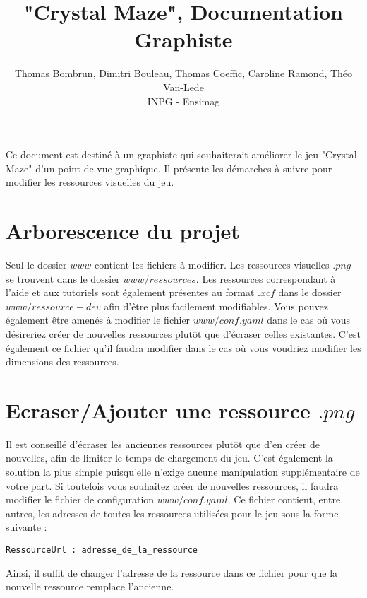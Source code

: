 \documentclass[11pt]{article}
\begin{document}
\title{"Crystal Maze", Documentation Graphiste}
\author{Thomas Bombrun, Dimitri Bouleau, Thomas Coeffic, Caroline Ramond, Théo Van-Lede\\
INPG - Ensimag}
\renewcommand{\today}{17 Juin 2014}
\maketitle

Ce document est destiné à un graphiste qui souhaiterait améliorer le jeu "Crystal Maze" d'un point de vue graphique. Il présente les démarches à suivre pour modifier les ressources visuelles du jeu.

\section{Arborescence du projet}
Seul le dossier $www$ contient les fichiers à modifier. Les ressources visuelles $.png$ se trouvent dans le dossier $www/ressources$. Les ressources correspondant à l'aide et aux tutoriels sont également présentes au format $.xcf$ dans le dossier $www/ressource-dev$ afin d'être plus facilement modifiables. Vous pouvez également être amenés à modifier le fichier $www/conf.yaml$ dans le cas où vous désireriez créer de nouvelles ressources plutôt que d'écraser celles existantes. C'est également ce fichier qu'il faudra modifier dans le cas où vous voudriez modifier les dimensions des ressources.

\section{Ecraser/Ajouter une ressource $.png$}
Il est conseillé d'écraser les anciennes ressources plutôt que d'en créer de nouvelles, afin de limiter le temps de chargement du jeu. C'est également la solution la plus simple puisqu'elle n'exige aucune manipulation supplémentaire de votre part. Si toutefois vous souhaitez créer de nouvelles ressources, il faudra modifier le fichier de configuration $www/conf.yaml$. Ce fichier contient, entre autres, les adresses de toutes les ressources utilisées pour le jeu sous la forme suivante : \\
\begin{verbatim}
RessourceUrl : adresse_de_la_ressource
\end{verbatim}
Ainsi, il suffit de changer l'adresse de la ressource dans ce fichier pour que la nouvelle ressource remplace l'ancienne.
\end{document}
